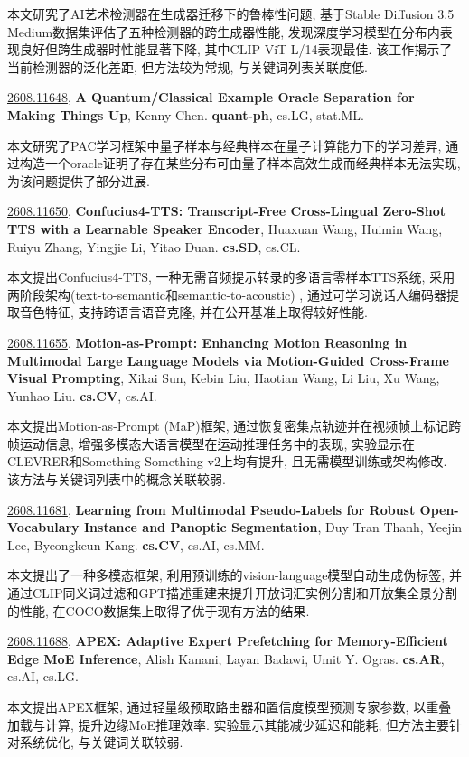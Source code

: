 \documentclass[9pt, a4paper]{article}
\theoremstyle{plain}
\theoremstyle{definition}
\theoremstyle{remark}
\newcommand{\arxivwithtarget}[3]{\hypertarget{#1}{}\href{https://arxiv.org/abs/#1}{#1}, \textbf{\textcolor{arxivblue}{#2}}, #3. }
\begin{document}
本文研究了AI艺术检测器在生成器迁移下的鲁棒性问题, 基于Stable Diffusion 3.5 Medium数据集评估了五种检测器的跨生成器性能, 发现深度学习模型在分布内表现良好但跨生成器时性能显著下降, 其中CLIP ViT-L/14表现最佳. 该工作揭示了当前检测器的泛化差距, 但方法较为常规, 与关键词列表关联度低.


\arxivwithtarget{2608.11648}{A Quantum/Classical Example Oracle Separation for Making Things Up}{Kenny Chen}\textbf{quant-ph}, cs.LG, stat.ML.

本文研究了PAC学习框架中量子样本与经典样本在量子计算能力下的学习差异, 通过构造一个oracle证明了存在某些分布可由量子样本高效生成而经典样本无法实现, 为该问题提供了部分进展.


\arxivwithtarget{2608.11650}{Confucius4-TTS: Transcript-Free Cross-Lingual Zero-Shot TTS with a Learnable Speaker Encoder}{Huaxuan Wang, Huimin Wang, Ruiyu Zhang, Yingjie Li, Yitao Duan}\textbf{cs.SD}, cs.CL.

本文提出Confucius4-TTS, 一种无需音频提示转录的多语言零样本TTS系统, 采用两阶段架构(text-to-semantic和semantic-to-acoustic) , 通过可学习说话人编码器提取音色特征, 支持跨语言语音克隆, 并在公开基准上取得较好性能.


\arxivwithtarget{2608.11655}{Motion-as-Prompt: Enhancing Motion Reasoning in Multimodal Large Language Models via Motion-Guided Cross-Frame Visual Prompting}{Xikai Sun, Kebin Liu, Haotian Wang, Li Liu, Xu Wang, Yunhao Liu}\textbf{cs.CV}, cs.AI.

本文提出Motion-as-Prompt (MaP)框架, 通过恢复密集点轨迹并在视频帧上标记跨帧运动信息, 增强多模态大语言模型在运动推理任务中的表现, 实验显示在CLEVRER和Something-Something-v2上均有提升, 且无需模型训练或架构修改. 该方法与关键词列表中的概念关联较弱.


\arxivwithtarget{2608.11681}{Learning from Multimodal Pseudo-Labels for Robust Open-Vocabulary Instance and Panoptic Segmentation}{Duy Tran Thanh, Yeejin Lee, Byeongkeun Kang}\textbf{cs.CV}, cs.AI, cs.MM.

本文提出了一种多模态框架, 利用预训练的vision-language模型自动生成伪标签, 并通过CLIP同义词过滤和GPT描述重建来提升开放词汇实例分割和开放集全景分割的性能, 在COCO数据集上取得了优于现有方法的结果.


\arxivwithtarget{2608.11688}{APEX: Adaptive Expert Prefetching for Memory-Efficient Edge MoE Inference}{Alish Kanani, Layan Badawi, Umit Y. Ogras}\textbf{cs.AR}, cs.AI, cs.LG.

本文提出APEX框架, 通过轻量级预取路由器和置信度模型预测专家参数, 以重叠加载与计算, 提升边缘MoE推理效率. 实验显示其能减少延迟和能耗, 但方法主要针对系统优化, 与关键词关联较弱.
\end{document}
